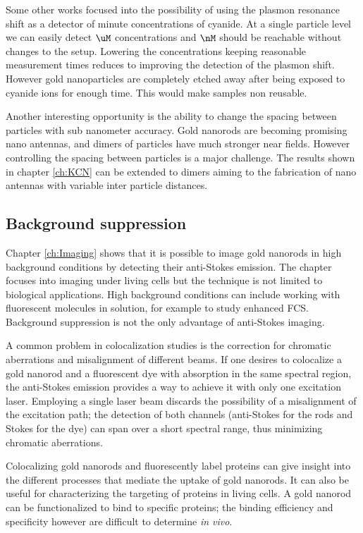 Some other works focused into the possibility of using the plasmon resonance
shift as a detector of minute concentrations of cyanide. At a single particle
level we can easily detect $\uM$ concentrations and $\nM$ should be reachable
without changes to the setup. Lowering the concentrations keeping reasonable
measurement times reduces to improving the detection of the plasmon shift.
However gold nanoparticles are completely etched away after being exposed to
cyanide ions for enough time. This would make samples non reusable.

Another interesting opportunity is the ability to change the spacing between
particles with sub nanometer accuracy. Gold nanorods are becoming promising nano
antennas, and dimers of particles have much stronger near fields. However
controlling the spacing between particles is a major challenge. The results
shown in chapter \ref{ch:KCN} can be extended to dimers aiming to the
fabrication of nano antennas with variable inter particle distances.

\subsection{Background suppression}
Chapter \ref{ch:Imaging} shows that it is possible to image gold nanorods in
high background conditions by detecting their anti-Stokes emission. The chapter
focuses into imaging under living cells but the technique is not limited to
biological applications. High background conditions can include working with
fluorescent molecules in solution, for example to study enhanced FCS. Background
suppression is not the only advantage of anti-Stokes imaging.

A common problem in colocalization studies is the correction for chromatic
aberrations and misalignment of different beams. If one desires to colocalize a
gold nanorod and a fluorescent dye with absorption in the same spectral region,
the anti-Stokes emission provides a way to achieve it with only one excitation
laser. Employing a single laser beam discards the possibility of a misalignment
of the excitation path; the detection of both channels (anti-Stokes for the rods
and Stokes for the dye) can span over a short spectral range, thus
minimizing chromatic aberrations.

Colocalizing gold nanorods and fluorescently label proteins can give insight
into the different processes that mediate the uptake of gold nanorods. It can
also be useful for characterizing the targeting of proteins in living cells. A
gold nanorod can be functionalized to bind to specific proteins; the binding
efficiency and specificity however are difficult to determine \textit{in vivo}.

